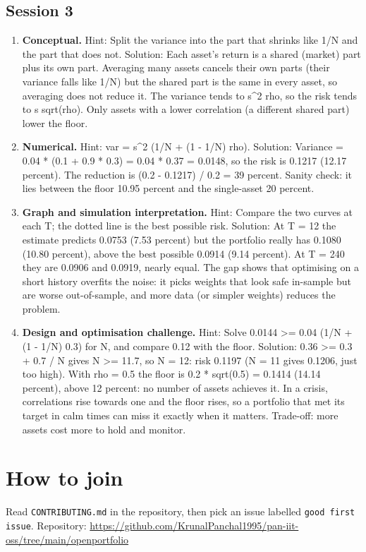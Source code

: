 \documentclass[11pt,a4paper]{article}
\begin{document}
\subsection*{Session 3}
\begin{enumerate}[nosep]
\item \textbf{Conceptual.} Hint: Split the variance into the part that shrinks like 1/N and the part that does not. Solution: Each asset's return is a shared (market) part plus its own part. Averaging many assets cancels their own parts (their variance falls like 1/N) but the shared part is the same in every asset, so averaging does not reduce it. The variance tends to s\textasciicircum{}2 rho, so the risk tends to s sqrt(rho). Only assets with a lower correlation (a different shared part) lower the floor.
\item \textbf{Numerical.} Hint: var = s\textasciicircum{}2 (1/N + (1 - 1/N) rho). Solution: Variance = 0.04 * (0.1 + 0.9 * 0.3) = 0.04 * 0.37 = 0.0148, so the risk is 0.1217 (12.17 percent). The reduction is (0.2 - 0.1217) / 0.2 = 39 percent. Sanity check: it lies between the floor 10.95 percent and the single-asset 20 percent.
\item \textbf{Graph and simulation interpretation.} Hint: Compare the two curves at each T; the dotted line is the best possible risk. Solution: At T = 12 the estimate predicts 0.0753 (7.53 percent) but the portfolio really has 0.1080 (10.80 percent), above the best possible 0.0914 (9.14 percent). At T = 240 they are 0.0906 and 0.0919, nearly equal. The gap shows that optimising on a short history overfits the noise: it picks weights that look safe in-sample but are worse out-of-sample, and more data (or simpler weights) reduces the problem.
\item \textbf{Design and optimisation challenge.} Hint: Solve 0.0144 \textgreater{}= 0.04 (1/N + (1 - 1/N) 0.3) for N, and compare 0.12 with the floor. Solution: 0.36 \textgreater{}= 0.3 + 0.7 / N gives N \textgreater{}= 11.7, so N = 12: risk 0.1197 (N = 11 gives 0.1206, just too high). With rho = 0.5 the floor is 0.2 * sqrt(0.5) = 0.1414 (14.14 percent), above 12 percent: no number of assets achieves it. In a crisis, correlations rise towards one and the floor rises, so a portfolio that met its target in calm times can miss it exactly when it matters. Trade-off: more assets cost more to hold and monitor.
\end{enumerate}

\section{How to join}
Read \texttt{CONTRIBUTING.md} in the repository, then pick an issue labelled \texttt{good first issue}. Repository: \url{https://github.com/KrunalPanchal1995/pan-iit-oss/tree/main/openportfolio}
\end{document}
